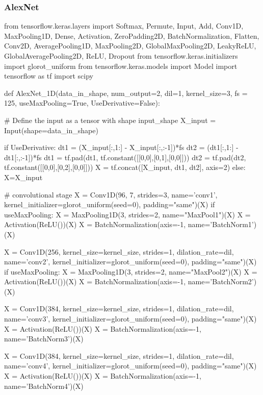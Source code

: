 \subsubsection*{AlexNet}
\begin{python}    
    from tensorflow.keras.layers import Softmax, Permute, Input, Add, Conv1D, MaxPooling1D, Dense, Activation, ZeroPadding2D, BatchNormalization, Flatten, Conv2D, AveragePooling1D, MaxPooling2D, GlobalMaxPooling2D, LeakyReLU, GlobalAveragePooling2D, ReLU, Dropout
    from tensorflow.keras.initializers import glorot_uniform
    from tensorflow.keras.models import Model
    import tensorflow as tf
    import scipy
    
    def AlexNet_1D(data_in_shape, num_output=2, dil=1, kernel_size=3, fs = 125, useMaxPooling=True, UseDerivative=False):
    
        # Define the input as a tensor with shape input_shape
        X_input = Input(shape=data_in_shape)
    
        if UseDerivative:
            dt1 = (X_input[:,1:] - X_input[:,:-1])*fs
            dt2 = (dt1[:,1:] - dt1[:,:-1])*fs
            dt1 = tf.pad(dt1, tf.constant([[0,0],[0,1],[0,0]]))
            dt2 = tf.pad(dt2, tf.constant([[0,0],[0,2],[0,0]]))
            X = tf.concat([X_input, dt1, dt2], axis=2)
        else:
            X=X_input
    
    
        # convolutional stage
        X = Conv1D(96, 7, strides=3, name='conv1', kernel_initializer=glorot_uniform(seed=0), padding="same")(X)
        if useMaxPooling:
            X = MaxPooling1D(3, strides=2, name="MaxPool1")(X)
        X = Activation(ReLU())(X)
        X = BatchNormalization(axis=-1, name='BatchNorm1')(X)
    
        X = Conv1D(256, kernel_size=kernel_size, strides=1, dilation_rate=dil, name='conv2', kernel_initializer=glorot_uniform(seed=0), padding="same")(X)
        if useMaxPooling:
            X = MaxPooling1D(3, strides=2, name="MaxPool2")(X)
        X = Activation(ReLU())(X)
        X = BatchNormalization(axis=-1, name='BatchNorm2')(X)
    
        X = Conv1D(384, kernel_size=kernel_size, strides=1, dilation_rate=dil, name='conv3', kernel_initializer=glorot_uniform(seed=0), padding="same")(X)
        X = Activation(ReLU())(X)
        X = BatchNormalization(axis=-1, name='BatchNorm3')(X)
    
        X = Conv1D(384, kernel_size=kernel_size, strides=1, dilation_rate=dil, name='conv4', kernel_initializer=glorot_uniform(seed=0), padding="same")(X)
        X = Activation(ReLU())(X)
        X = BatchNormalization(axis=-1, name='BatchNorm4')(X)
    

\end{python}
